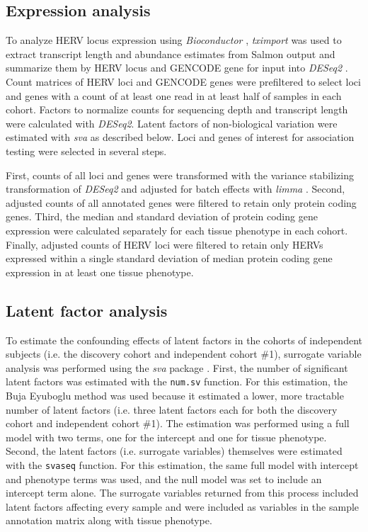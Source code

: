 \subsection*{Expression analysis}
To analyze HERV locus expression using \emph{Bioconductor} \citep{bioc}, \emph{tximport} \citep{Soneson2015} was used to extract transcript length and abundance estimates from Salmon output and summarize them by HERV locus and GENCODE gene for input into \emph{DESeq2} \citep{Love2014}.
Count matrices of HERV loci and GENCODE genes were prefiltered to select loci and genes with a count of at least one read in at least half of samples in each cohort.
Factors to normalize counts for sequencing depth and transcript length were calculated with \emph{DESeq2}.
Latent factors of non-biological variation were estimated with \emph{sva} \citep{sva} as described below.
Loci and genes of interest for association testing were selected in several steps.

First, counts of all loci and genes were transformed with the variance stabilizing transformation of \emph{DESeq2} and adjusted for batch effects with \emph{limma} \citep{Ritchie2015}.
Second, adjusted counts of all annotated genes were filtered to retain only protein coding genes.
Third, the median and standard deviation of protein coding gene expression were calculated separately for each tissue phenotype in each cohort.
Finally, adjusted counts of HERV loci were filtered to retain only HERVs expressed within a single standard deviation of median protein coding gene expression in at least one tissue phenotype.

\subsection*{Latent factor analysis}
To estimate the confounding effects of latent factors in the cohorts of independent subjects (i.e. the discovery cohort and independent cohort \#1), surrogate variable analysis was performed using the \emph{sva} package \citep{sva}.
First, the number of significant latent factors was estimated with the \verb|num.sv| function.
For this estimation, the Buja Eyuboglu method was used because it estimated a lower, more tractable number of latent factors (i.e. three latent factors each for both the discovery cohort and independent cohort \#1).
The estimation was performed using a full model with two terms, one for the intercept and one for tissue phenotype.
Second, the latent factors (i.e. surrogate variables) themselves were estimated with the \verb|svaseq| function.
For this estimation, the same full model with intercept and phenotype terms was used, and the null model was set to include an intercept term alone.
The surrogate variables returned from this process included latent factors affecting every sample and were included as variables in the sample annotation matrix along with tissue phenotype.

